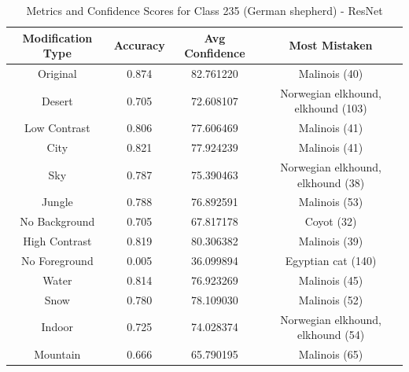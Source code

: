 \begin{table}
	\centering
	\begin{tabular}{|c|c|c|c|}
		\hline
		\textbf{Modification Type} & \textbf{Accuracy} & \textbf{Avg Confidence} & \textbf{Most Mistaken} \\
		\hline
		Original & 0.874 & 82.761220 & Malinois (40) \\
		\hline
		Desert & 0.705 & 72.608107 & Norwegian elkhound, elkhound (103) \\
		\hline
		Low Contrast & 0.806 & 77.606469 & Malinois (41) \\
		\hline
		City & 0.821 & 77.924239 & Malinois (41) \\
		\hline
		Sky & 0.787 & 75.390463 & Norwegian elkhound, elkhound (38) \\
		\hline
		Jungle & 0.788 & 76.892591 & Malinois (53) \\
		\hline
		No Background & 0.705 & 67.817178 & Coyot (32) \\
		\hline
		High Contrast & 0.819 & 80.306382 & Malinois (39) \\
		\hline
		No Foreground & 0.005 & 36.099894 & Egyptian cat (140) \\
		\hline
		Water & 0.814 & 76.923269 & Malinois (45) \\
		\hline
		Snow & 0.780 & 78.109030 & Malinois (52) \\
		\hline
		Indoor & 0.725 & 74.028374 & Norwegian elkhound, elkhound (54) \\
		\hline
		Mountain & 0.666 & 65.790195 & Malinois (65) \\
		\hline
	\end{tabular}
	\caption{Metrics and Confidence Scores for Class 235 (German shepherd) - ResNet}
	\label{tab:metrics_confidence_class_235_resnet}
\end{table}

